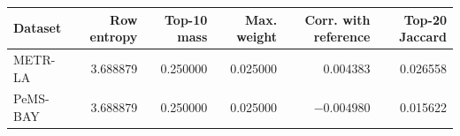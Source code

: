 \begin{tabular}{lrrrrr}
\toprule
Dataset & Row entropy & Top-10 mass & Max. weight & Corr. with reference & Top-20 Jaccard\\
\midrule
METR-LA & 3.688879 & 0.250000 & 0.025000 & 0.004383 & 0.026558\\
PeMS-BAY & 3.688879 & 0.250000 & 0.025000 & $-0.004980$ & 0.015622\\
\bottomrule
\end{tabular}
